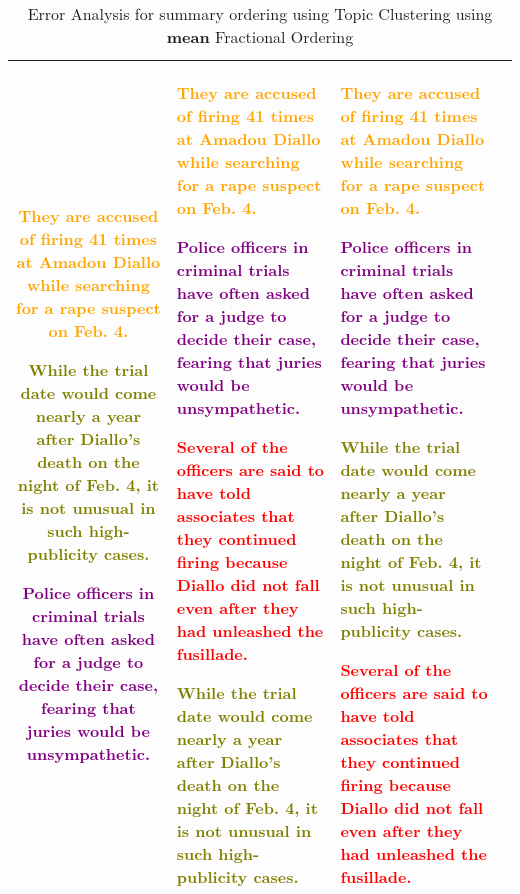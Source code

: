 \begin{table*}[t]
\begin{tabular}{|c|p{4.3cm}|p{4.3cm}|p{4.3cm}|}
        \textcolor{orange}{They are accused of firing 41 times at Amadou Diallo while searching for a rape suspect on Feb. 4.}
        
        \textcolor{olive}{While the trial date would come nearly a year after Diallo's death on the night of Feb. 4, it is not unusual in such high-publicity cases.}
        
        \textcolor{purple}{Police officers in criminal trials have often asked for a judge to decide their case, fearing that juries would be unsympathetic.}
        
        & 
         \textcolor{orange}{They are accused of firing 41 times at Amadou Diallo while searching for a rape suspect on Feb. 4.}

         \textcolor{purple}{Police officers in criminal trials have often asked for a judge to decide their case, fearing that juries would be unsympathetic.}

        \textcolor{red}{Several of the officers are said to have told associates that they continued firing because Diallo did not fall even after they had unleashed the fusillade.}

        \textcolor{olive}{While the trial date would come nearly a year after Diallo's death on the night of Feb. 4, it is not unusual in such high-publicity cases.}
        & 
        \textcolor{orange}{They are accused of firing 41 times at Amadou Diallo while searching for a rape suspect on Feb. 4.}

        \textcolor{purple}{Police officers in criminal trials have often asked for a judge to decide their case, fearing that juries would be unsympathetic.}

        \textcolor{olive}{While the trial date would come nearly a year after Diallo's death on the night of Feb. 4, it is not unusual in such high-publicity cases.}

        \textcolor{red}{Several of the officers are said to have told associates that they continued firing because Diallo did not fall even after they had unleashed the fusillade.} \\
        \hline
    \end{tabular}
    \caption{Error Analysis for summary ordering using Topic Clustering using \textbf{mean} Fractional Ordering}
    \label{clustering_mean}
\end{table*}